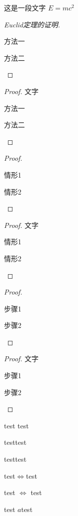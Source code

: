 \documentclass{ctexart}
\begin{document}
\begin{analysis}
  这是一段文字 $E = m c^2$
\end{analysis}

\begin{proof}[Euclid定理的证明]
  \begin{method}
    \item 方法一
    \item 方法二
  \end{method}
\end{proof}

\begin{proof}
  文字
  \begin{method}
    \item 方法一
    \item 方法二
  \end{method}
\end{proof}

\begin{proof}
  \begin{case}
    \item 情形1
    \item 情形2
  \end{case}
\end{proof}

\begin{proof}
  文字
  \begin{case}
    \item 情形1
    \item 情形2
  \end{case}
\end{proof}

\begin{proof}
  \begin{step}
    \item 步骤1
    \item 步骤2
  \end{step}
\end{proof}

\begin{proof}
  文字
  \begin{step}
    \item 步骤1
    \item 步骤2
  \end{step}
\end{proof}







test \overlay[below-scale = 1.5] test

test\overlay[below-scale = 1.5]test

test\overlay test

test$\Longleftrightarrow$test

test $\Longleftrightarrow$ test

test{ $a$}test
\end{document}
